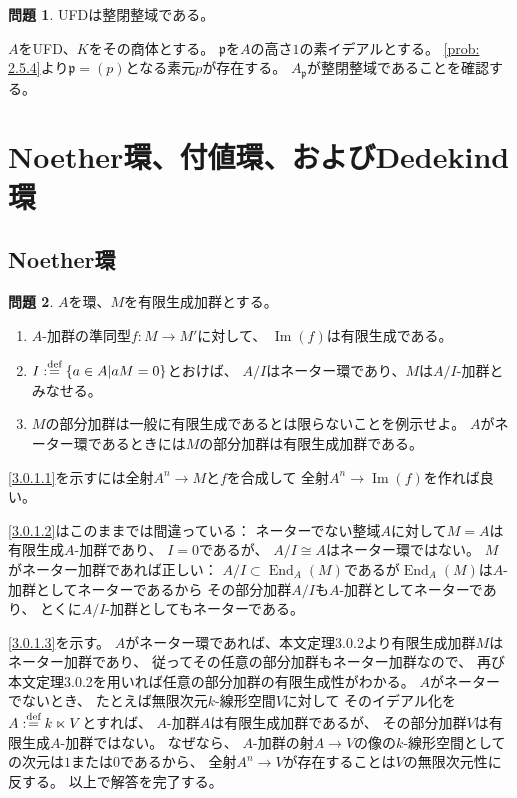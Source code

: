 \documentclass[uplatex]{jsarticle}
\makeatletter
\theoremstyle{definition}
\newtheorem{prob}[prob]{問題}
\renewenvironment{proof}[1][\proofname]{
  \pushQED{\qed}%
  \normalfont \topsep6\p@\@plus6\p@\relax
  \trivlist
  \item[\hskip\labelsep
    #1\@addpunct{\textbf{.}}]\ignorespaces
}{%
  \popQED\endtrivlist\@endpefalse
}
\providecommand{\proofname}{証明}
\DeclareMathOperator{\End}{\mathrm{End}}
\DeclareMathOperator{\im}{\mathrm{Im}}
\newcommand\mfp{\mathfrak{p}}
\def\dfn{:\overset{\mbox{{\scriptsize def}}}{=}}
\makeatother
\begin{document}
\begin{prob}\label{prob: 2.5.5}
  UFDは整閉整域である。
\end{prob}

\begin{proof}
  \(A\)をUFD、\(K\)をその商体とする。
  \(\mfp\)を\(A\)の高さ\(1\)の素イデアルとする。
  \ref{prob: 2.5.4}より\(\mfp = (p)\)となる素元\(p\)が存在する。
  \(A_{\mfp}\)が整閉整域であることを確認する。
\end{proof}




\section{Noether環、付値環、およびDedekind環}


\subsection{Noether環}

\begin{prob}\label{3.0.1}
  \(A\)を環、\(M\)を有限生成加群とする。
  \begin{enumerate}
    \item \label{3.0.1.1}
    \(A\)-加群の準同型\(f:M\to M'\)に対して、
    \(\im(f)\)は有限生成である。
    \item \label{3.0.1.2}
    \(I\dfn \{ a\in A | aM = 0\}\)とおけば、
    \(A/I\)はネーター環であり、\(M\)は\(A/I\)-加群とみなせる。
    \item \label{3.0.1.3}
    \(M\)の部分加群は一般に有限生成であるとは限らないことを例示せよ。
    \(A\)がネーター環であるときには\(M\)の部分加群は有限生成加群である。
  \end{enumerate}
\end{prob}

\begin{proof}
  \ref{3.0.1.1}を示すには全射\(A^n\to M\)と\(f\)を合成して
  全射\(A^n\to \im(f)\)を作れば良い。

  \ref{3.0.1.2}はこのままでは間違っている：
  ネーターでない整域\(A\)に対して\(M=A\)は有限生成\(A\)-加群であり、
  \(I=0\)であるが、
  \(A/I\cong A\)はネーター環ではない。
  \(M\)がネーター加群であれば正しい：
  \(A/I\subset \End_A(M)\)であるが\(\End_A(M)\)は\(A\)-加群としてネーターであるから
  その部分加群\(A/I\)も\(A\)-加群としてネーターであり、
  とくに\(A/I\)-加群としてもネーターである。

  \ref{3.0.1.3}を示す。
  \(A\)がネーター環であれば、本文定理3.0.2より有限生成加群\(M\)はネーター加群であり、
  従ってその任意の部分加群もネーター加群なので、
  再び本文定理3.0.2を用いれば任意の部分加群の有限生成性がわかる。
  \(A\)がネーターでないとき、
  たとえば無限次元\(k\)-線形空間\(V\)に対して
  そのイデアル化を\(A\dfn k\ltimes V\)とすれば、
  \(A\)-加群\(A\)は有限生成加群であるが、
  その部分加群\(V\)は有限生成\(A\)-加群ではない。
  なぜなら、
  \(A\)-加群の射\(A\to V\)の像の\(k\)-線形空間としての次元は\(1\)または\(0\)であるから、
  全射\(A^n\to V\)が存在することは\(V\)の無限次元性に反する。
  以上で解答を完了する。
\end{proof}
\end{document}
